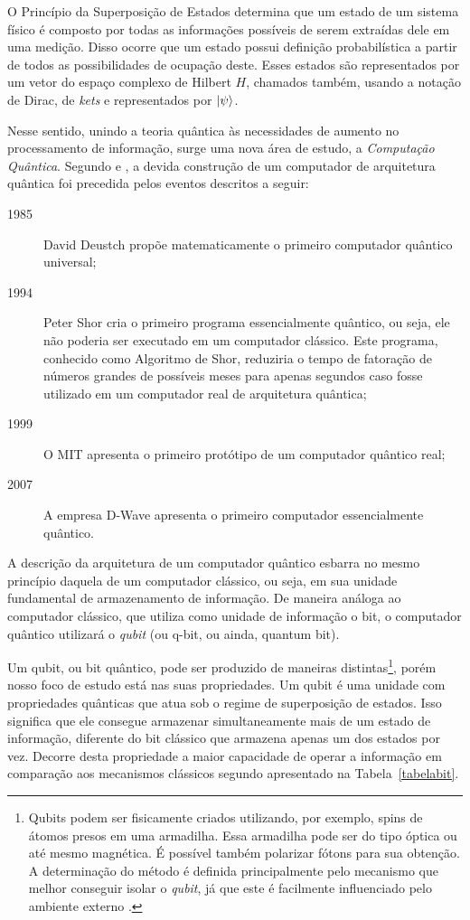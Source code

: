 \documentclass[11pt,oneside,brazil,hidelinks,article,sumario=tradicional,a4paper]{abntex2}
\begin{document}
O Princípio da Superposição de Estados determina que um estado de um sistema físico é composto por todas as informações possíveis de serem extraídas dele em uma medição. Disso ocorre que um estado possui definição probabilística a partir de todos as possibilidades de ocupação deste. Esses estados são representados por um vetor do espaço complexo de Hilbert $H$, chamados também, usando a notação de Dirac, de \textit{kets} e representados por $\ket{\psi}$.

Nesse sentido, unindo a teoria quântica às necessidades de aumento no processamento de informação, surge uma nova área de estudo, a \textit{Computação Quântica}. Segundo \textcite{CompInfoQuantica} e \textcite{dwave}, a devida construção de um computador de arquitetura quântica foi precedida pelos eventos descritos a seguir:

\begin{description}
  \item[1985] David Deustch propõe matematicamente o primeiro computador quântico universal;
  \item[1994] Peter Shor cria o primeiro programa essencialmente quântico, ou seja, ele não poderia ser executado em um computador clássico. Este programa, conhecido como Algoritmo de Shor, reduziria o tempo de fatoração de números grandes de possíveis meses para apenas segundos caso fosse utilizado em um computador real de arquitetura quântica;
  \item[1999] O MIT apresenta o primeiro protótipo de um computador quântico real;
  \item[2007] A empresa D-Wave apresenta o primeiro computador essencialmente quântico.
\end{description}

A descrição da arquitetura de um computador quântico esbarra no mesmo princípio daquela de um computador clássico, ou seja, em sua unidade fundamental de armazenamento de informação. De maneira análoga ao computador clássico, que utiliza como unidade de informação o bit, o computador quântico utilizará o \textit{qubit} (ou q-bit, ou ainda, quantum bit).

Um qubit, ou bit quântico, pode ser produzido de maneiras distintas\footnote{Qubits podem ser fisicamente criados utilizando, por exemplo, spins de átomos presos em uma armadilha. Essa armadilha pode ser do tipo óptica ou até mesmo magnética. É possível também polarizar fótons para sua obtenção. A determinação do método é definida principalmente pelo mecanismo que melhor conseguir isolar o \textit{qubit}, já que este é facilmente influenciado pelo ambiente externo \cite{materialdidaticomecquantica}.}, porém nosso foco de estudo está nas suas propriedades. Um qubit é uma unidade com propriedades quânticas que atua sob o regime de superposição de estados. Isso significa que ele consegue armazenar simultaneamente mais de um estado de informação, diferente do bit clássico que armazena apenas um dos estados por vez. Decorre desta propriedade a maior capacidade de operar a informação em comparação aos mecanismos clássicos segundo apresentado na Tabela~\ref{tabelabit}.
\end{document}
